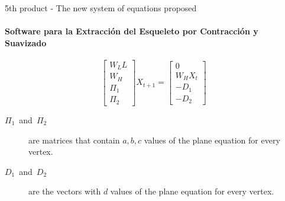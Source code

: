 \documentclass[10pt, compress, english]{beamer}
\begin{document}
\begin{frame}{5th product - The new system of equations proposed}


\framesubtitle{Software para la Extracción del Esqueleto por Contracción y Suavizado}
 

\begin{equation}
\left[\begin{array}{c}
W_{L}L\\
W_{H}\\
\Pi_{1}\\
\Pi_{2}
\end{array}\right]X_{t+1}=\left[\begin{array}{c}
0\\
W_{H}X_{t}\\
-D_{1}\\
-D_{2}
\end{array}\right]\label{eq:SkeletonExtractionDistance}
\end{equation}

\begin{description}
\item [{$\Pi_{1}$~and~$\Pi_{2}$}] are matrices that contain $a,b,c$
values of the plane equation for every vertex. 
\item [{$D_{1}$~and~$D_{2}$}] are the vectors with $d$ values of the
plane equation for every vertex.
\end{description}
\end{frame}
\end{document}

